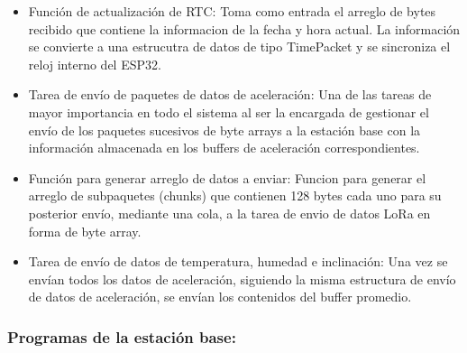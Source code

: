 \begin{itemize}
    \item Función de actualización de RTC: Toma como entrada el arreglo de bytes recibido que contiene la informacion de la fecha y hora actual. La información se convierte a una estrucutra de datos de tipo TimePacket y se sincroniza el reloj interno del ESP32.
    
    \item Tarea de envío de paquetes de datos de aceleración: Una de las tareas de mayor importancia en todo el sistema al ser la encargada de gestionar el envío de los paquetes sucesivos de byte arrays a la estación base con la información almacenada en los buffers de aceleración correspondientes. 
    
    \item Función para generar arreglo de datos a enviar: Funcion para generar el arreglo de subpaquetes (chunks) que contienen 128 bytes cada uno para su posterior envío, mediante una cola, a la tarea de envio de datos LoRa en forma de byte array.
    
    \item Tarea de envío de datos de temperatura, humedad e inclinación: Una vez se envían todos los datos de aceleración, siguiendo la misma estructura de envío de datos de aceleración, se envían los contenidos del buffer promedio.
    
\end{itemize}


\subsubsection{Programas de la estación base:}


